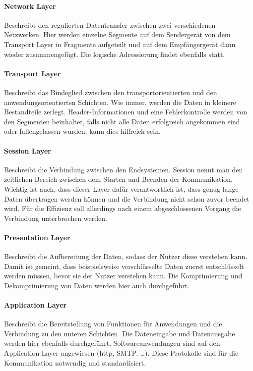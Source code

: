 \documentclass[titlepage,12pt,twoside]{article}
\begin{document}
\paragraph{Network Layer}
\hfill \break
\hfill \break
Beschreibt den regulierten Datentransfer zwischen zwei verschiedenen Netzwerken. Hier 
werden einzelne Segmente auf dem Sendergerät von dem Transport Layer in Fragmente 
aufgeteilt und auf dem Empfängergerät dann wieder zusammengefügt. Die logische Adressierung 
findet ebenfalls statt. \\

\paragraph{Transport Layer}
\hfill \break
\hfill \break
Beschreibt das Bindeglied zwischen den transportorientierten und den anwendungsorientierten 
Schichten. Wie immer, werden die Daten in kleinere Bestandteile zerlegt. Header-Informationen 
und eine Fehlerkontrolle werden von den Segmenten beinhaltet, falls nicht alle Daten 
erfolgreich angekommen sind oder fallengelassen wurden, kann dies hilfreich sein. \\

\paragraph{Session Layer}
\hfill \break
\hfill \break
Beschreibt die Verbindung zwischen den Endsystemen. Session nennt man den zeitlichen 
Bereich zwischen dem Starten und Beenden der Kommunikation. Wichtig ist auch, dass 
dieser Layer dafür verantwortlich ist, dass genug lange Daten übertragen werden können 
und die Verbindung nicht schon zuvor beendet wird. Für die Effizienz soll allerdings 
nach einem abgeschlossenen Vorgang die Verbindung unterbrochen werden. \\

\paragraph{Presentation Layer}
\hfill \break
\hfill \break
Beschreibt die Aufbereitung der Daten, sodass der Nutzer diese verstehen kann. Damit 
ist gemeint, dass beispielsweise verschlüsselte Daten zuerst entschlüsselt werden 
müssen, bevor sie der Nutzer verstehen kann. Die Komprimierung und Dekomprimierung 
von Daten werden hier auch durchgeführt. \\

\paragraph{Application Layer}
\hfill \break
\hfill \break
Beschreibt die Bereitstellung von Funktionen für Anwendungen und die Verbindung zu 
den unteren Schichten. Die Dateneingabe und Datenausgabe werden hier ebenfalls 
durchgeführt. Softwareanwendungen sind auf den Application Layer angewiesen (http, SMTP, …). 
Diese Protokolle sind für die Kommunikation notwendig und standardisiert. \\
\end{document}
